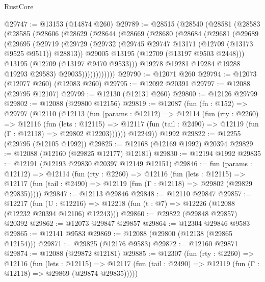 \begin{lexlean}{RustCore}
\begin{coremodule}
@29747 := @13153 (@14874 @260)
@29789 := @28515
    (@28540
      (@28581
        (@28583
          (@28585
            (@28606
              (@28629
                (@28644
                  (@28669
                    (@28680
                      (@28684
                        (@29681
                          (@29689
                            (@29695
                              (@29719
                                (@29729
                                  (@29732
                                    (@29745 @29747 @13171 (@12709 (@13173 @9525 @9511)) @28813))
                                  @29005
                                  @13195
                                  (@12709 (@13197 @9503 @2448)))
                                @13195
                                (@12709 (@13197 @9470 @9533)))
                              @19278
                              @19281
                              @19284
                              @19288
                              @19293
                              @29583)
                            @29035))))))))))))
@29790 := @12071 @260
@29794 := @12073 (@12077 @260) (@12083 @260)
@29795 := @12092 @20391
@29797 := @12088 (@29795 @12107)
@29799 := @12130 (@12131 @260)
@29800 := @12126 @29799
@29802 := @12088 (@29800 @12156)
@29819 := @12087
    (fun (fn : @152) =>
    @29797
      (@12110
        (@12113
          (fun (params : @12112) =>
          @12114
            (fun (rty : @2260) =>
            @12116
              (fun (lets : @12115) =>
              @12117 (fun (tail : @2490) => @12119 (fun (Γ : @12118) => @29802 @12203))))))
        @12249))
    @1992
@29822 := @12255 (@29795 (@12105 @1992))
@29825 := @12168 (@12169 @1992) @20394
@29829 := @12088 (@12160 (@29825 @12177) @12181)
@29830 := @12194 @1992
@29835 := @12191 (@12193 @29830 @20397 @12149 @12151)
@29846 := fun (params : @12112) =>
  @12114
    (fun (rty : @2260) =>
    @12116
      (fun (lets : @12115) =>
      @12117 (fun (tail : @2490) => @12119 (fun (Γ : @12118) => @29802 (@29829 @29835)))))
@29847 := @12113 @29846
@29848 := @12110 @29847
@29857 := @12217
    (fun (U : @12216) => @12218 (fun (t : @7) => @12226 (@12088 (@12232 @20394 @12106) @12243)))
@29860 := @29822 (@29848 @29857) @20392
@29862 := @12073 @29847 @29857
@29864 := @12304 @29846 @9583
@29865 := @12141 @9583
@29869 := @12088 (@29800 (@12138 (@29865 @12154)))
@29871 := @29825 (@12176 @9583)
@29872 := @12160 @29871
@29874 := @12088 (@29872 @12181)
@29885 := @12307
    (fun (rty : @2260) =>
    @12116
      (fun (lets : @12115) =>
      @12117 (fun (tail : @2490) => @12119 (fun (Γ : @12118) => @29869 (@29874 @29835)))))

\end{coremodule}
\end{lexlean}
